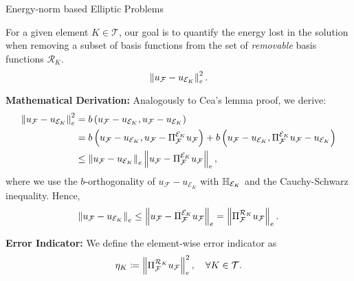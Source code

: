 \begin{frame}{Energy-norm based Elliptic Problems}

For a given element $K \in \mathcal{T}$, our goal is to quantify the energy lost in the solution when removing a subset of basis functions from the set of \emph{removable} basis functions $\mathcal{R}_K$. %
\[\left\|u_{\mathcal{F}} - u_{\mathcal{E}_K}\right\|_e^2.\]

\textbf{Mathematical Derivation:} Analogously to Cea's lemma proof, we derive:
\begin{align}
  \left\|u_{\mathcal{F}}-u_{\mathcal{E}_K}\right\|_e^2 &= b\left(u_{\mathcal{F}}-u_{\mathcal{E}_K},u_{\mathcal{F}}-u_{\mathcal{E}_K}\right) \\
  &= b\left(u_{\mathcal{F}}-u_{\mathcal{E}_K},u_{\mathcal{F}}-\Pi_{\mathcal{F}}^{\mathcal{E}_K} u_{\mathcal{F}}\right) + b\left(u_{\mathcal{F}}-u_{\mathcal{E}_K},\Pi_{\mathcal{F}}^{\mathcal{E}_K}u_{\mathcal{F}}-u_{\mathcal{E}_K}\right) \\
  &\leq \left\|u_{\mathcal{F}}-u_{\mathcal{E}_K}\right\|_{e}\left\|u_{\mathcal{F}}-\Pi_{\mathcal{F}}^{\mathcal{E}_K}u_{\mathcal{F}}\right\|_e,
\end{align}
where we use the $b$-orthogonality of $u_{\mathcal{F}}-u_{\mathcal{E}_K}$ with $\mathbb{H}_{\mathcal{E}_K}$ and the Cauchy-Schwarz inequality. Hence,
\begin{equation}
  \left\|u_{\mathcal{F}}-u_{\mathcal{E}_K}\right\|_e \leq \left\|u_{\mathcal{F}}-\Pi_{\mathcal{F}}^{\mathcal{E}_K} u_{\mathcal{F}}\right\|_e=\left\|\Pi_{\mathcal{F}}^{\mathcal{R}_K} u_{\mathcal{F}}\right\|_e. \label{eq:upperboundSPD}
\end{equation}

\textbf{Error Indicator:} We define the element-wise error indicator as
\begin{equation}
  \eta_K\coloneqq \left\|\Pi_{\mathcal{F}}^{\mathcal{R}_K} u_{\mathcal{F}}\right\|_e^2, \quad \forall K \in \mathcal{T}.\label{eq:SPDindicators}
\end{equation}

\end{frame}

